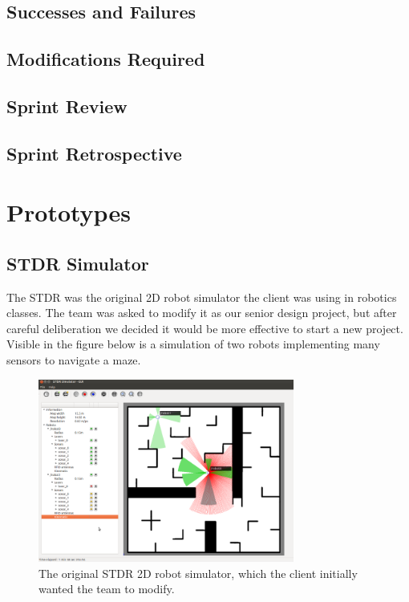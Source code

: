 \subsection{Successes and Failures}


\subsection{Modifications Required}


\subsection{Sprint Review}


\subsection{Sprint Retrospective}

 
\section{Prototypes}

\subsection{STDR Simulator}

The STDR was the original 2D robot simulator the client was using in robotics classes. The team was asked to modify it as our senior design project, but after careful deliberation we decided it would be more effective to start a new project. Visible in the figure below is a simulation of two robots implementing many sensors to navigate a maze.

\begin{figure}[!htb]
\begin{center}
\includegraphics[width=0.75\textwidth]{./Images/Sprint0_STDR}
\end{center}
\caption{The original STDR 2D robot simulator, which the client initially wanted the team to modify.  \label{stdr}}
\end{figure}

